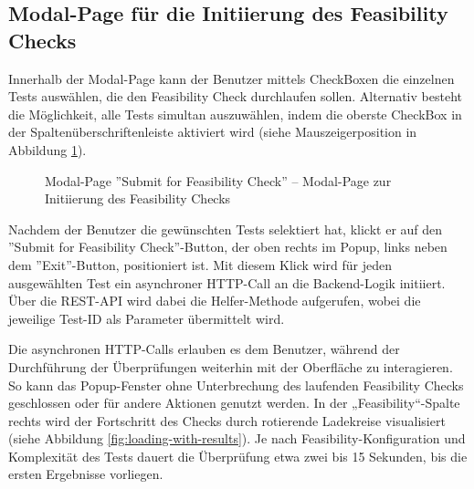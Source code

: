 \subsection{Modal-Page für die Initiierung des Feasibility Checks}

Innerhalb der Modal-Page kann der Benutzer mittels CheckBoxen die einzelnen Tests auswählen, die den Feasibility Check durchlaufen sollen. Alternativ besteht die Möglichkeit, alle Tests simultan auszuwählen, indem die oberste CheckBox in der Spaltenüberschriftenleiste aktiviert wird (siehe Mauszeigerposition in Abbildung \ref{fig:submit-page}).

\begin{figure}[!htbp] 
    \centering 
    \caption{Modal-Page ''Submit for Feasibility Check'' – Modal-Page zur Initiierung des Feasibility Checks} 
    \label{fig:submit-page} 
\end{figure}

Nachdem der Benutzer die gewünschten Tests selektiert hat, klickt er auf den \linebreak ''Submit for Feasibility Check''-Button, der oben rechts im Popup, links neben dem ''Exit''-Button, positioniert ist. Mit diesem Klick wird für jeden ausgewählten Test ein asynchroner HTTP-Call an die Backend-Logik initiiert. Über die REST-API wird dabei die Helfer-Methode aufgerufen, wobei die jeweilige Test-ID als Parameter übermittelt wird.

Die asynchronen HTTP-Calls erlauben es dem Benutzer, während der Durchführung der Überprüfungen weiterhin mit der Oberfläche zu interagieren. So kann das Popup-Fenster ohne Unterbrechung des laufenden Feasibility Checks geschlossen oder für andere Aktionen genutzt werden. In der „Feasibility“-Spalte rechts wird der Fortschritt des Checks durch rotierende Ladekreise visualisiert (siehe Abbildung \ref{fig:loading-with-results}). Je nach Feasibility-Konfiguration und Komplexität des Tests dauert die Überprüfung etwa zwei bis 15 Sekunden, bis die ersten Ergebnisse vorliegen.

